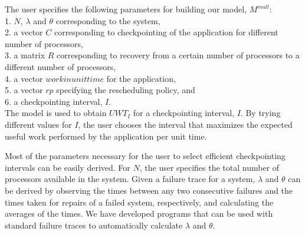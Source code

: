 \documentclass[conference,10pt]{IEEEtran}
\begin{document}
The user specifies the following parameters for building our model,
$M^{mall}$: \\
1. $N$, $\lambda$ and $\theta$ corresponding to the system, \\
2. a vector $C$ corresponding to checkpointing of the
application for different number of processors, \\
3. a matrix $R$ corresponding to recovery from a certain number of processors to a
different number of processors, \\
4. a vector $workinunittime$ for the application, \\
5. a vector $rp$ specifying the rescheduling policy, and \\
6. a checkpointing interval, $I$. \\
The model is used to obtain $UWT_I$ for a checkpointing interval,
$I$. By trying different values for $I$, the user chooses the interval
that maximizes the expected useful work performed by the application
per unit time. 

Most of the parameters necessary for the user to select efficient
checkpointing intervals can be easily derived. For $N$, the user
specifies the total number of processors available in the
system. Given a failure trace for a system, $\lambda$ and $\theta$ can
be derived by observing the times between any two consecutive failures
and the times taken for repairs of a failed system, respectively, and
calculating the averages of the times. We have developed programs that
can be used with standard failure traces to automatically calculate
$\lambda$ and $\theta$.
\end{document}
